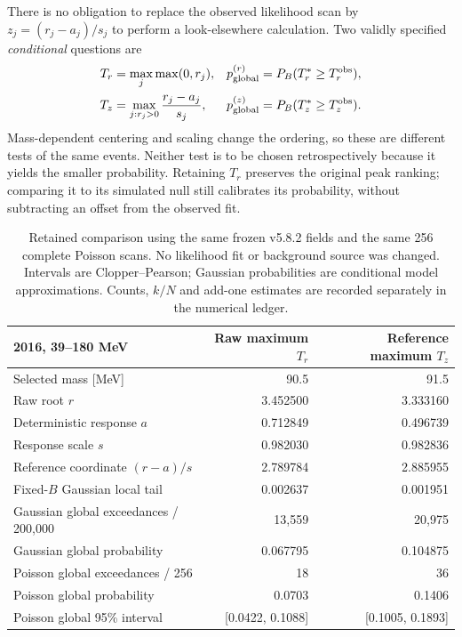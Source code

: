 There is no obligation to replace the observed likelihood scan by
$z_j=(r_j-a_j)/s_j$ to perform a look-elsewhere calculation. Two validly specified
\emph{conditional} questions are
\begin{align}
 T_r&=\max_j\max(0,r_j), &p_{\rm global}^{(r)}&=P_B(T_r^*\ge T_r^{\rm obs}),\\
 T_z&=\max_{j:r_j>0}\frac{r_j-a_j}{s_j},
 &p_{\rm global}^{(z)}&=P_B(T_z^*\ge T_z^{\rm obs}).
\end{align}
Mass-dependent centering and scaling change the ordering, so these are different
tests of the same events. Neither test is to be chosen retrospectively because
it yields the smaller probability. Retaining $T_r$ preserves the original
peak ranking; comparing it to its simulated null still calibrates its
probability, without subtracting an offset from the observed fit.

\begin{table}[htbp]\centering\small
\begin{tabular}{lrr}
\hline
2016, 39--180 MeV & Raw maximum $T_r$ & Reference maximum $T_z$\\
\hline
Selected mass [MeV] &90.5&91.5\\
Raw root $r$ &3.452500&3.333160\\
Deterministic response $a$ &0.712849&0.496739\\
Response scale $s$ &0.982030&0.982836\\
Reference coordinate $(r-a)/s$ &2.789784&2.885955\\
Fixed-$B$ Gaussian local tail &0.002637&0.001951\\
Gaussian global exceedances / 200,000 &13,559&20,975\\
Gaussian global probability &0.067795&0.104875\\
Poisson global exceedances / 256 &18&36\\
Poisson global probability &0.0703&0.1406\\
Poisson global 95\% interval &[0.0422, 0.1088]&[0.1005, 0.1893]\\
\hline
\end{tabular}
\caption{Retained comparison using the same frozen v5.8.2 fields and the same 256
complete Poisson scans. No likelihood fit or background source was changed.
Intervals are Clopper--Pearson; Gaussian probabilities are conditional model
approximations. Counts, $k/N$ and add-one estimates are recorded separately in
the numerical ledger.}
\label{tab:raw-reference-statistics}
\end{table}

